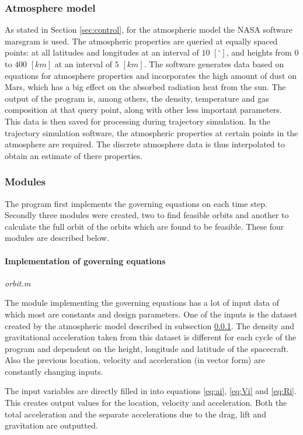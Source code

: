 \subsubsection{Atmosphere model}\label{subsec:atmos}
As stated in Section \ref{sec:control}, for the atmospheric model the NASA software \gls{marsgram} is used. The atmospheric properties are queried at equally spaced points: at all latitudes and longitudes at an interval of $10$ $[^\circ]$, and heights from $0$ to $400$ $[km]$ at an interval of $5$ $[km]$. The software generates data based on equations for atmosphere properties and incorporates the high amount of dust on Mars, which has a big effect on the absorbed radiation heat from the sun. The output of the program is, among others, the density, temperature and gas composition at that query point, along with other less important parameters. \cite{Justus2001}
This data is then saved for processing during trajectory simulation. In the trajectory simulation software, the atmospheric properties at certain points in the atmosphere are required. The discrete atmosphere data is thus interpolated to obtain an estimate of there properties. 

\subsubsection{Modules} \label{subsec:modules}

The program first implements the governing equations on each time step. Secondly three modules were created, two to find feasible orbits and another to calculate the full orbit of the orbits which are found to be feasible. These four modules are described below.

\paragraph{Implementation of governing equations}\textit{orbit.m}

The module implementing the governing equations has a lot of input data of which most are constants and design parameters. One of the inputs is the dataset created by the atmospheric model described in subsection \ref{subsec:atmos}. The density and gravitational acceleration taken from this dataset is different for each cycle of the program and dependent on the height, longitude and latitude of the spacecraft. Also the previous location, velocity and acceleration (in vector form) are constantly changing inputs.

The input variables are directly filled in into equations \ref{eq:ai}, \ref{eq:Vi} and \ref{eq:Ri}. This creates output values for the location, velocity and acceleration. Both the total acceleration and the separate accelerations due to the drag, lift and gravitation are outputted.

